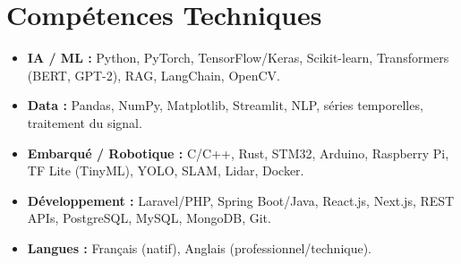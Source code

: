 \documentclass[a4paper,11pt]{article}
\begin{document}
\section{Compétences Techniques}
\begin{itemize}[leftmargin=*, nosep]
    \item \small{\textbf{IA / ML :} Python, PyTorch, TensorFlow/Keras, Scikit-learn, Transformers (BERT, GPT-2), RAG, LangChain, OpenCV.}
    \item \small{\textbf{Data :} Pandas, NumPy, Matplotlib, Streamlit, NLP, séries temporelles, traitement du signal.}
    \item \small{\textbf{Embarqué / Robotique :} C/C++, Rust, STM32, Arduino, Raspberry Pi, TF Lite (TinyML), YOLO, SLAM, Lidar, Docker.}
    \item \small{\textbf{Développement :} Laravel/PHP, Spring Boot/Java, React.js, Next.js, REST APIs, PostgreSQL, MySQL, MongoDB, Git.}
    \item \small{\textbf{Langues :} Français (natif), Anglais (professionnel/technique).}
\end{itemize}

\end{document}
